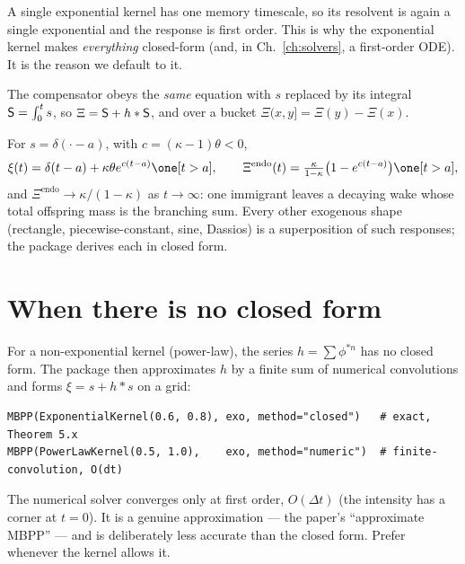 \begin{whybox}
A single exponential kernel has one memory timescale, so its resolvent is again a
single exponential and the response is first order. This is why the exponential
kernel makes \emph{everything} closed-form (and, in Ch.~\ref{ch:solvers}, a
first-order ODE). It is the reason we default to it.
\end{whybox}

The compensator obeys the \emph{same} equation with $s$ replaced by its integral
$\mathsf{S}=\int_0^t s$, so $\Xi=\mathsf{S}+h*\mathsf{S}$, and over a bucket
$\Xi(x,y]=\Xi(y)-\Xi(x)$.

\begin{examplebox}
For $s=\delta(\cdot-a)$, with $c=(\kappa-1)\theta<0$,
\[
\xi(t)=\delta(t-a)+\kappa\theta e^{c(t-a)}\one[t>a],\qquad
\Xi^{\mathrm{endo}}(t)=\tfrac{\kappa}{1-\kappa}\big(1-e^{c(t-a)}\big)\one[t>a],
\]
and $\Xi^{\mathrm{endo}}\to\kappa/(1-\kappa)$ as $t\to\infty$: one immigrant leaves
a decaying wake whose total offspring mass is the branching sum. Every other
exogenous shape (rectangle, piecewise-constant, sine, Dassios) is a superposition
of such responses; the package derives each in closed form.
\end{examplebox}

\section{When there is no closed form}

For a non-exponential kernel (power-law), the series $h=\sum\phi^{*n}$ has no
closed form. The package then approximates $h$ by a finite sum of numerical
convolutions and forms $\xi=s+h*s$ on a grid:

\begin{lstlisting}[caption={Exact vs numerical MBPP (from \code{mbpp/core.py}).}]
MBPP(ExponentialKernel(0.6, 0.8), exo, method="closed")   # exact, Theorem 5.x
MBPP(PowerLawKernel(0.5, 1.0),    exo, method="numeric")  # finite-convolution, O(dt)
\end{lstlisting}

\begin{pitfall}
The numerical solver converges only at first order, $O(\Delta t)$ (the intensity
has a corner at $t=0$). It is a genuine approximation --- the paper's ``approximate
MBPP'' --- and is deliberately less accurate than the closed form. Prefer
 whenever the kernel allows it.
\end{pitfall}

